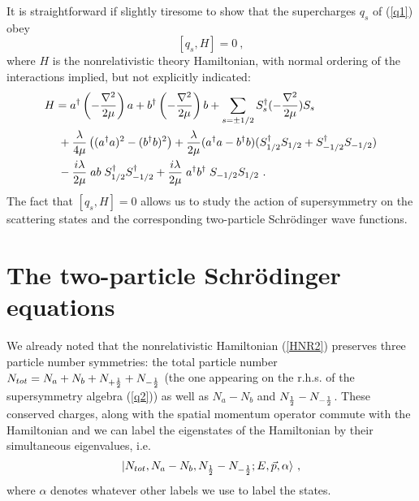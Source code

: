 \documentclass[11pt]{article}
\begin{document}
It  is  straightforward if slightly tiresome  to show that the supercharges $q_s$ of (\ref{q1})   obey \begin{equation}
\label{susy2}
[q_s,H]=0~,
\end{equation} where $H$ is the nonrelativistic theory Hamiltonian, with normal ordering of the interactions implied, but not explicitly indicated:\begin{align}
 \label{HNR2}
H &=     {a}^\dagger  \left(- {\nabla^2 \over 2 \mu}\right)  {a} +  {b}^\dagger \left(- {\nabla^2 \over 2 \mu}\right)   {b} + \sum_{s = \pm 1/2} S^\dagger_s (- {\nabla^2 \over 2 \mu}) S_s  \nonumber \\
 & \;  +   {\lambda \over  4 \mu} \left(  
 ({a}^\dagger  {a})^2 - ({b}^\dagger  {b})^2 \right) + {\lambda \over 2 \mu}(a^\dagger a - b^\dagger b)(S_{1/2}^\dagger S_{1/2} +S_{-1/2}^\dagger S_{-1/2}) \\
 & \; - { i \lambda   \over 2 \mu}  \;a b \; S_{1/2}^\dagger S^\dagger_{-1/2} + { i \lambda   \over 2 \mu}   \;a^\dagger b^\dagger \;S_{-1/2} S_{1/2}~.\nonumber
 \end{align} 
The    fact that  $[q_s,H]=0$   allows us to study the action of supersymmetry on the scattering states and the corresponding two-particle Schr\" odinger wave functions.
  
\section{The two-particle Schr\" odinger equations}
 \label{schrodinger}
 
 We already noted that the nonrelativistic Hamiltonian  (\ref{HNR2}) preserves three particle number symmetries: the total particle number $N_{tot} = N_a + N_b + N_{+{1\over 2}} + N_{-{1\over 2}}$ (the one appearing on the r.h.s. of the supersymmetry algebra (\ref{q2})) as well as  $N_a - N_b$ and $N_{{1\over 2}} - N_{- {1\over 2}}$. These conserved charges, along with the spatial momentum operator commute with the Hamiltonian and we can label the eigenstates of the Hamiltonian by their simultaneous eigenvalues, i.e.
 \begin{equation}
 \label{states}
 |N_{tot}, N_a - N_b, N_{1\over 2} - N_{-{1\over 2}}; E, \vec{p}, \alpha \rangle~,
 \end{equation}
 where $\alpha$ denotes whatever other labels we use to label the states. 
 
\end{document}
